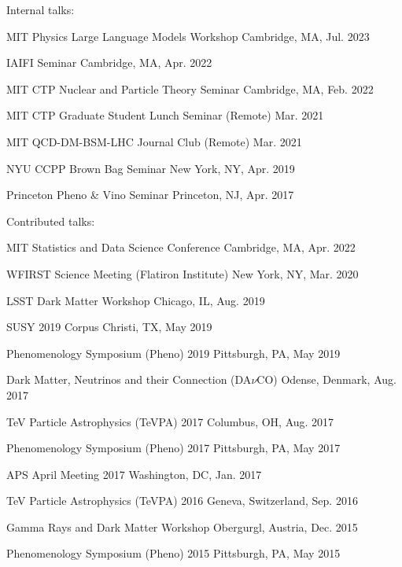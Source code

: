 \documentclass[letterpaper,11pt]{article}
\newenvironment{packed_itemize}{
\begin{itemize}[label=\raisebox{0.25ex}{\tiny$\bullet$}]
  \setlength{\itemsep}{4.2pt}
  \setlength{\parskip}{0pt}
  \setlength{\parsep}{0pt}}{\end{itemize}
}
\begin{document}
\noindent
Internal talks:
\begin{packed_itemize}
  \item MIT Physics Large Language Models Workshop \hfill Cambridge, MA, Jul. 2023
  \item IAIFI Seminar \hfill Cambridge, MA, Apr. 2022
  \item MIT CTP Nuclear and Particle Theory Seminar \hfill Cambridge, MA, Feb. 2022
  \item MIT CTP Graduate Student Lunch Seminar (Remote) \hfill Mar. 2021
  \item MIT QCD-DM-BSM-LHC Journal Club (Remote) \hfill Mar. 2021
  \item NYU CCPP Brown Bag Seminar \hfill New York, NY, Apr. 2019
  \item Princeton Pheno \& Vino Seminar \hfill Princeton, NJ, Apr. 2017
\end{packed_itemize}

\noindent
Contributed talks:
\begin{packed_itemize}
  \item MIT Statistics and Data Science Conference  \hfill Cambridge, MA, Apr. 2022
  \item WFIRST Science Meeting (Flatiron Institute) \hfill New York, NY, Mar. 2020
  \item LSST Dark Matter Workshop \hfill Chicago, IL, Aug. 2019
  \item SUSY 2019 \hfill Corpus Christi, TX, May 2019
  \item Phenomenology Symposium (Pheno) 2019 \hfill Pittsburgh, PA, May 2019
  \item Dark Matter, Neutrinos and their Connection (DA$\nu$CO) \hfill Odense, Denmark, Aug. 2017
  \item TeV Particle Astrophysics (TeVPA) 2017 \hfill Columbus, OH, Aug. 2017 
  \item Phenomenology Symposium (Pheno) 2017 \hfill Pittsburgh, PA, May 2017 
  \item APS April Meeting 2017 \hfill Washington, DC, Jan. 2017 
  \item TeV Particle Astrophysics (TeVPA) 2016 \hfill Geneva, Switzerland, Sep. 2016 
  \item Gamma Rays and Dark Matter Workshop \hfill Obergurgl, Austria, Dec. 2015
  \item Phenomenology Symposium (Pheno) 2015 \hfill Pittsburgh, PA, May 2015
\end{packed_itemize}
\vspace{2.0mm}
\end{document}
